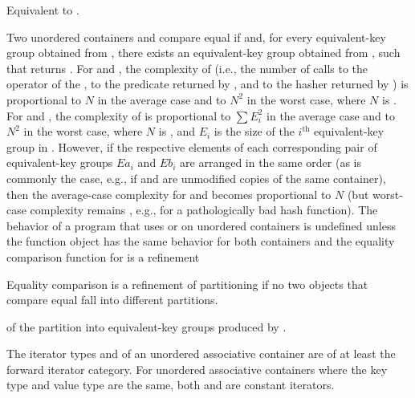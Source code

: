 \begin{itemdescr}
\pnum
\effects
Equivalent to .
\end{itemdescr}

\pnum
Two unordered containers  and  compare equal if
 and, for every equivalent-key group
 obtained from , there exists an
equivalent-key group  obtained from ,
such that
 returns . For
 and , the complexity of
 (i.e., the number of calls to the \tcode{==} operator
of the , to the predicate returned by ,
and to the hasher returned by ) is proportional to
$N$ in the average case and to $N^2$ in the worst case, where $N$ is
. For  and ,
the complexity of  is proportional to $\sum E_i^2$
in the average case and to $N^2$ in the worst case, where $N$ is ,
and $E_i$ is the size of the $i^\text{th}$ equivalent-key group in .
However, if the respective elements of each corresponding pair of
equivalent-key groups $Ea_i$ and $Eb_i$ are arranged in the same order
(as is commonly the case, e.g., if  and  are unmodified copies
of the same container), then the average-case complexity for
 and  becomes
proportional to $N$ (but worst-case complexity remains , e.g., for
a pathologically bad hash function). The behavior of a program that uses
 or  on unordered containers is undefined
unless the  function object has
the same behavior for both containers and the equality comparison function
for  is a refinement
\begin{footnote}
Equality comparison is a refinement
of partitioning if no two objects that
compare equal fall into different partitions.
\end{footnote}
of the partition into equivalent-key groups produced by .

\pnum
{}%
The iterator types  and  of
an unordered associative container are of at least the forward iterator
category.  For unordered associative containers where the key type and
value type are the same, both  and
 are constant iterators.

